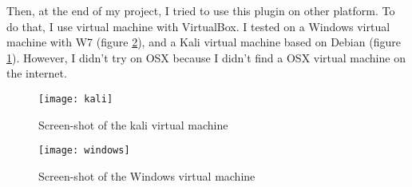 Then, at the end of my project, I tried to use this plugin on other platform. To do that, I use virtual machine with VirtualBox. I tested on a Windows virtual machine with W7 (figure \ref{fig:windows}), and a Kali virtual machine based on Debian (figure \ref{fig:kali}). However, I didn't try on OSX because I didn't find a OSX virtual machine on the internet.

\begin{figure}[h]
  \centering
  \texttt{[image: kali]}
  \caption{Screen-shot of the kali virtual machine}
  \label{fig:kali}
\end{figure}

\begin{figure}[h]
  \centering
  \texttt{[image: windows]}
  \caption{Screen-shot of the Windows virtual machine}
  \label{fig:windows}
\end{figure}


